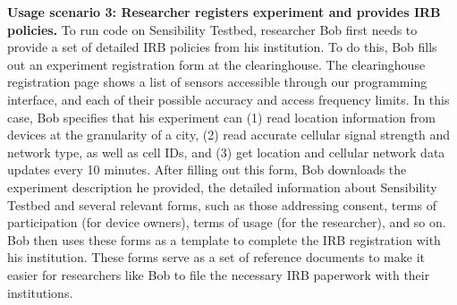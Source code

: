 \textbf{Usage scenario 3: Researcher registers experiment and provides IRB policies.}
To run code on Sensibility Testbed, researcher Bob first needs to 
provide a set of detailed IRB policies from his institution. 
To do this, Bob fills out an experiment
registration form  at the 
clearinghouse. The clearinghouse registration page shows 
a list of sensors accessible through our programming interface, and 
each of their possible accuracy and access frequency limits. 
In this case, Bob specifies that 
his experiment can (1) read location information
from devices at the granularity of a city, (2) read accurate
cellular signal strength and network type, as well as
cell IDs, and (3) get location and
cellular network data updates every 10 minutes. 
%
After filling out this form, Bob downloads the experiment description 
he provided, the detailed information about Sensibility Testbed and 
several relevant forms, such as 
those addressing consent, terms of participation (for device owners),  
terms of usage (for the researcher), and so on.   
Bob then uses these forms as a template to complete the IRB registration 
with his institution. These forms serve as a set of reference documents 
to make it easier for researchers like Bob to 
file the necessary IRB paperwork with their institutions.

